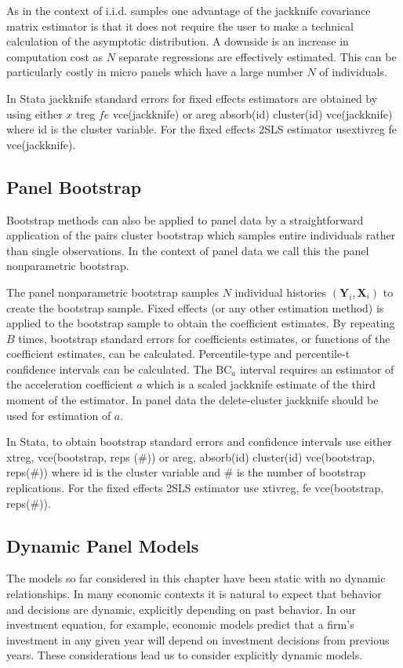 \documentclass[10pt]{article}
\begin{document}
As in the context of i.i.d. samples one advantage of the jackknife covariance matrix estimator is that it does not require the user to make a technical calculation of the asymptotic distribution. A downside is an increase in computation cost as $N$ separate regressions are effectively estimated. This can be particularly costly in micro panels which have a large number $N$ of individuals.

In Stata jackknife standard errors for fixed effects estimators are obtained by using either $x$ treg $f e$ vce(jackknife) or areg absorb(id) cluster(id) vce(jackknife) where id is the cluster variable. For the fixed effects 2SLS estimator usextivreg fe vce(jackknife).

\subsection{Panel Bootstrap}
Bootstrap methods can also be applied to panel data by a straightforward application of the pairs cluster bootstrap which samples entire individuals rather than single observations. In the context of panel data we call this the panel nonparametric bootstrap.

The panel nonparametric bootstrap samples $N$ individual histories $\left(\boldsymbol{Y}_{i}, \boldsymbol{X}_{i}\right)$ to create the bootstrap sample. Fixed effects (or any other estimation method) is applied to the bootstrap sample to obtain the coefficient estimates. By repeating $B$ times, bootstrap standard errors for coefficients estimates, or functions of the coefficient estimates, can be calculated. Percentile-type and percentile-t confidence intervals can be calculated. The $\mathrm{BC}_{a}$ interval requires an estimator of the acceleration coefficient $a$ which is a scaled jackknife estimate of the third moment of the estimator. In panel data the delete-cluster jackknife should be used for estimation of $a$.

In Stata, to obtain bootstrap standard errors and confidence intervals use either xtreg, vce(bootstrap, reps (\#)) or areg, absorb(id) cluster(id) vce(bootstrap, reps(\#)) where id is the cluster variable and \# is the number of bootstrap replications. For the fixed effects 2SLS estimator use xtivreg, fe vce(bootstrap, reps(\#)).

\subsection{Dynamic Panel Models}
The models so far considered in this chapter have been static with no dynamic relationships. In many economic contexts it is natural to expect that behavior and decisions are dynamic, explicitly depending on past behavior. In our investment equation, for example, economic models predict that a firm's investment in any given year will depend on investment decisions from previous years. These considerations lead us to consider explicitly dynamic models.
\end{document}
